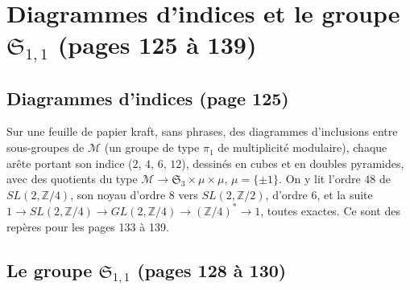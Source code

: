 \documentclass[11pt,a4paper]{article}
\begin{document}
\section*{Diagrammes d'indices et le groupe $\mathfrak{S}_{1,1}$ (pages 125 à 139)}

\subsection*{Diagrammes d'indices (page 125)}

Sur une feuille de papier kraft, sans phrases, des diagrammes d'inclusions
entre sous-groupes de $\mathcal{M}$ (un groupe de type $\pi_1$ de multiplicité
modulaire), chaque arête portant son indice ($2$, $4$, $6$, $12$), dessinés en
cubes et en doubles pyramides, avec des quotients du type
$\mathcal{M} \to \mathfrak{S}_3 \times \mu \times \mu$, $\mu = \{\pm 1\}$. On y lit
l'ordre $48$ de $SL(2, \mathbb{Z}/4)$, son noyau d'ordre $8$ vers
$SL(2, \mathbb{Z}/2)$, d'ordre $6$, et la suite
$1 \to SL(2, \mathbb{Z}/4) \to GL(2, \mathbb{Z}/4) \to (\mathbb{Z}/4)^* \to 1$,
toutes exactes. Ce sont des repères pour les pages 133 à 139.

\subsection*{Le groupe $\mathfrak{S}_{1,1}$ (pages 128 à 130)}
\end{document}
